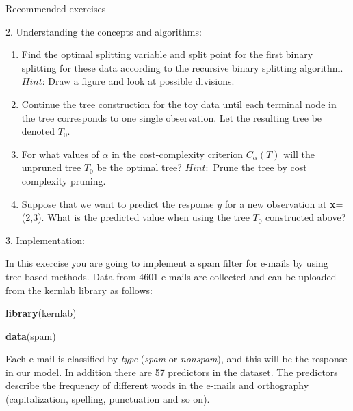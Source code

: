 \documentclass[ignorenonframetext,]{beamer}
\newenvironment{Shaded}{\begin{snugshade}}{\end{snugshade}}
\newcommand{\KeywordTok}[1]{\textcolor[rgb]{0.13,0.29,0.53}{\textbf{#1}}}
\newcommand{\NormalTok}[1]{#1}
\begin{document}
\begin{frame}[fragile]{Recommended exercises}
\begin{block}{2. Understanding the concepts and algorithms:}
\begin{enumerate}
\def\labelenumi{\alph{enumi})}
\setcounter{enumi}{2}
\item
  Find the optimal splitting variable and split point for the first
  binary splitting for these data according to the recursive binary
  splitting algorithm. \(Hint\): Draw a figure and look at possible
  divisions.
\item
  Continue the tree construction for the toy data until each terminal
  node in the tree corresponds to one single observation. Let the
  resulting tree be denoted \(T_0\).
\item
  For what values of \(\alpha\) in the cost-complexity criterion
  \(C_{\alpha}(T)\) will the unpruned tree \(T_0\) be the optimal tree?
  \(Hint:\) Prune the tree by cost complexity pruning.
\item
  Suppose that we want to predict the response \(y\) for a new
  observation at \textbf{x}=(2,3). What is the predicted value when
  using the tree \(T_0\) constructed above?
\end{enumerate}

\end{block}

\begin{block}{3. Implementation:}

In this exercise you are going to implement a spam filter for e-mails by
using tree-based methods. Data from 4601 e-mails are collected and can
be uploaded from the kernlab library as follows:

\begin{Shaded}
\begin{Highlighting}[]
\KeywordTok{library}\NormalTok{(kernlab)}

\KeywordTok{data}\NormalTok{(spam)}
\end{Highlighting}
\end{Shaded}

Each e-mail is classified by \emph{type} (\emph{spam} or
\emph{nonspam}), and this will be the response in our model. In addition
there are 57 predictors in the dataset. The predictors describe the
frequency of different words in the e-mails and orthography
(capitalization, spelling, punctuation and so on).


\end{block}
\end{frame}
\end{document}
